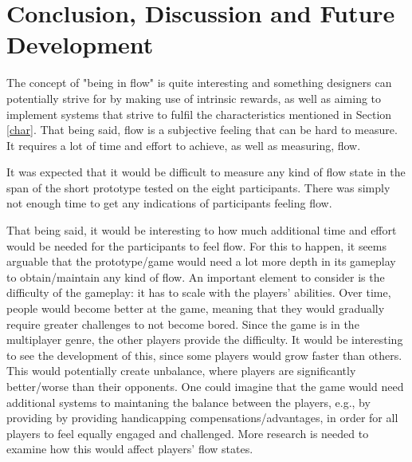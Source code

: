 \chapter{Conclusion, Discussion and Future Development}
The concept of "being in flow" is quite interesting and something designers can potentially strive for by making use of intrinsic rewards, as well as aiming to implement systems that strive to fulfil the characteristics mentioned in Section \ref{char}. That being said, flow is a subjective feeling that can be hard to measure. It requires a lot of time and effort to achieve, as well as measuring, flow.

It was expected that it would be difficult to measure any kind of flow state in the span of the short prototype tested on the eight participants. There was simply not enough time to get any indications of participants feeling flow.

That being said, it would be interesting to how much additional time and effort would be needed for the participants to feel flow. For this to happen, it seems arguable that the prototype/game would need a lot more depth in its gameplay to obtain/maintain any kind of flow. An important element to consider is the difficulty of the gameplay: it has to scale with the players' abilities. Over time, people would become better at the game, meaning that they would gradually require greater challenges to not become bored. Since the game is in the multiplayer genre, the other players provide the difficulty. It would be interesting to see the development of this, since some players would grow faster than others. This would potentially create unbalance, where players are significantly better/worse than their opponents. One could imagine that the game would need additional systems to maintaning the balance between the players, e.g., by providing by providing handicapping compensations/advantages, in order for all players to feel equally engaged and challenged. More research is needed to examine how this would affect players' flow states.
